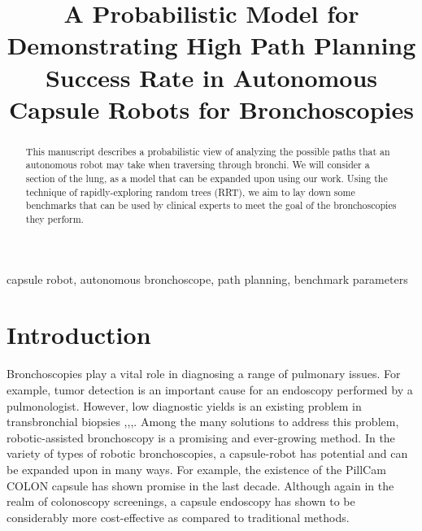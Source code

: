 \documentclass[conference]{IEEEtran}
\begin{document}
\title{A Probabilistic Model for Demonstrating High Path Planning Success Rate in Autonomous Capsule Robots for Bronchoscopies}

\author{
}

\maketitle

\begin{abstract}
This manuscript describes a probabilistic view of analyzing the
possible paths that an autonomous robot may take when traversing
through bronchi. We will consider a section of
the lung, as a model that can be expanded upon using our work. Using
the technique of rapidly-exploring random trees (RRT),
we aim to lay down some benchmarks that can be used
by clinical experts to meet the goal of the bronchoscopies
they perform.
\end{abstract}


\begin{IEEEkeywords}
    capsule robot, autonomous bronchoscope, path planning, benchmark parameters
\end{IEEEkeywords}

\section{Introduction}
Bronchoscopies play a vital role in diagnosing a range of pulmonary
issues. For example, tumor detection is an important cause for an
endoscopy performed by a pulmonologist. However, low diagnostic
yields is an existing problem in transbronchial biopsies
\cite{Rivera2013},\cite{WangMemoli2012},\cite{Mehta2018},\cite{Ost2016}.
Among the many solutions to address this
problem, robotic-assisted bronchoscopy is a promising
and ever-growing method\cite{Lu2021}. In the variety of types of robotic
bronchoscopies, a capsule-robot has potential and can be expanded upon in
many ways. For example, the existence of the PillCam COLON capsule has
shown promise in the last decade\cite{Adler2011}. Although again in
the realm of colonoscopy screenings, a capsule endoscopy has shown
to be considerably more cost-effective as compared to traditional
methods\cite{Hassan2008}.\\
\end{document}
